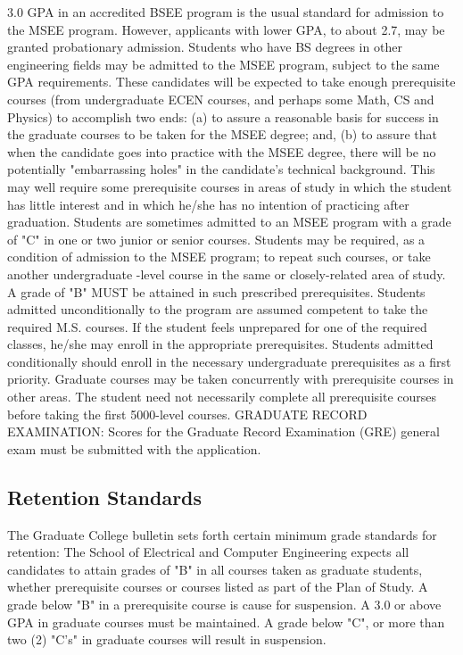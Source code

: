 3.0 GPA in an accredited BSEE program is the usual standard for admission to the MSEE program. However, applicants with lower GPA, to about 2.7, may be granted probationary admission. Students who have BS degrees in other engineering fields may be admitted to the MSEE program, subject to the same GPA requirements. These candidates will be expected to take enough prerequisite courses (from undergraduate ECEN courses, and perhaps some Math, CS and Physics) to accomplish two ends: (a) to assure a reasonable basis for success in the graduate courses to be taken for the MSEE degree; and, (b) to assure that when the candidate goes into practice with the MSEE degree, there will be no potentially "embarrassing holes" in the candidate's technical background. This may well require some prerequisite courses in areas of study in which the student has little interest and in which he/she has no intention of practicing after graduation. Students are sometimes admitted to an MSEE program with a grade of "C" in one or two junior or senior courses. Students may be required, as a condition of admission to the MSEE program; to repeat such courses, or take another undergraduate -level course in the same or closely-related area of study. A grade of "B" MUST be attained in such prescribed prerequisites.
Students admitted unconditionally to the program are assumed competent to take the required M.S. courses. If the student feels unprepared for one of the required classes, he/she may enroll in the appropriate prerequisites.
Students admitted conditionally should enroll in the necessary undergraduate prerequisites as a first priority. Graduate courses may be taken concurrently with prerequisite courses in other areas. The student need not necessarily complete all prerequisite courses before taking the first 5000-level courses.
GRADUATE RECORD EXAMINATION: Scores for the Graduate Record Examination (GRE) general exam must be submitted with the application.

\subsection{Retention Standards}

The Graduate College bulletin sets forth certain minimum grade standards for retention: The School of Electrical and Computer Engineering expects all candidates to attain grades of "B" in all courses taken as graduate students, whether prerequisite courses or courses listed as part of the Plan of Study. A grade below "B" in a prerequisite course is cause for suspension. A 3.0 or above GPA in graduate courses must be maintained. A grade below "C", or more than two (2) "C's" in graduate courses will result in suspension.

